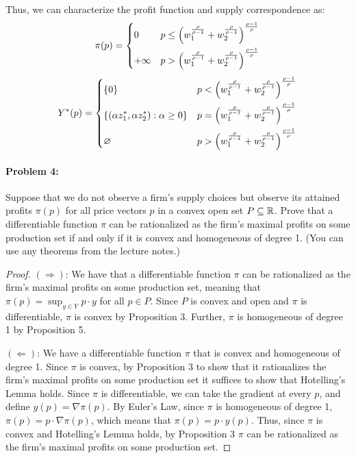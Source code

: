 \documentclass[12pt]{article}
\begin{document}
\begin{itemize}
\[    \]
    Thus, we can characterize the profit function and supply correspondence as:
    \[
    \pi(p) = \begin{dcases} 0 & p \le \left(w_1^{\frac{\rho}{\rho - 1}} + w_2^{\frac{\rho}{\rho - 1}} \right)^{\frac{\rho - 1}{\rho}} \\ +\infty & p > \left(w_1^{\frac{\rho}{\rho - 1}} + w_2^{\frac{\rho}{\rho - 1}} \right)^{\frac{\rho - 1}{\rho}} \end{dcases}
    \]
    \[
    Y^*(p) = \begin{dcases} \{0\} &  p < \left(w_1^{\frac{\rho}{\rho - 1}} + w_2^{\frac{\rho}{\rho - 1}} \right)^{\frac{\rho - 1}{\rho}} \\ \{(\alpha z_1^*,\alpha z_2^*) : \alpha \ge 0\} &  p = \left(w_1^{\frac{\rho}{\rho - 1}} + w_2^{\frac{\rho}{\rho - 1}} \right)^{\frac{\rho - 1}{\rho}} \\ \emptyset & p > \left(w_1^{\frac{\rho}{\rho - 1}} + w_2^{\frac{\rho}{\rho - 1}} \right)^{\frac{\rho - 1}{\rho}}\end{dcases}
    \]

    
\end{itemize}

\paragraph{Problem 4:} Suppose that we do not observe a firm's supply choices but observe its attained profits $\pi(p)$ for all price vectors $p$ in a convex open set $P \subseteq \reals$.  Prove that a differentiable function $\pi$ can be rationalized as the firm's maximal profits on some production set if and only if it is convex and homogeneous of degree 1. (You can use any theorems from
the lecture notes.)

\begin{proof}
    $(\Rightarrow)$: We have that a differentiable function $\pi$ can be rationalized as the firm's maximal profits on some production set, meaning that $\pi(p) = \sup_{y\in Y} p \cdot y$ for all $p \in P$. Since $P$ is convex and open and $\pi$ is differentiable, $\pi$ is convex by Proposition 3. Further, $\pi$ is homogeneous of degree 1 by Proposition 5.

    \medskip

    $(\Leftarrow)$: We have a differentiable function $\pi$ that is convex and homogeneous of degree 1. Since $\pi$ is convex, by Proposition 3 to show that it rationalizes the firm's maximal profits on some production set it suffices to show that Hotelling's Lemma holds. Since $\pi$ is differentiable, we can take the gradient at every $p$, and define $y(p) = \nabla \pi(p)$. By Euler's Law, since $\pi$ is homogeneous of degree 1, $\pi(p) = p \cdot \nabla \pi(p)$, which means that $\pi(p) = p \cdot y(p)$. Thus, since $\pi$ is convex and Hotelling's Lemma holds, by Proposition 3 $\pi$ can be rationalized as the firm's maximal profits on some production set.
\end{proof}
\end{document}
